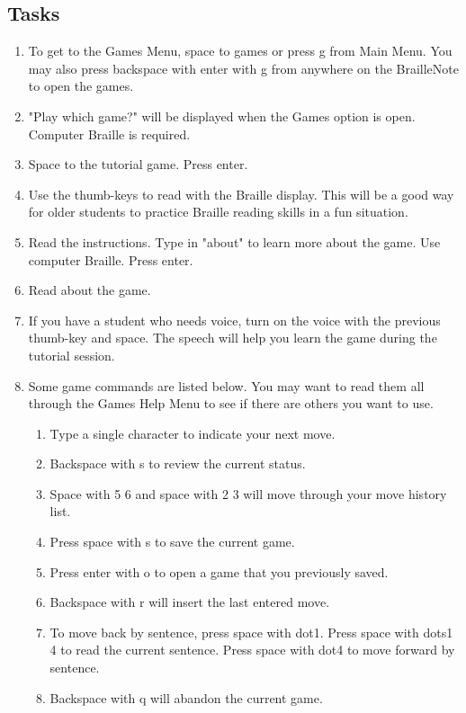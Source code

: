 \documentclass[10pt,letterpaper,twoside]{report}
\begin{document}
{{{\begin{enumerate}
	       \subsection{Tasks}
	      \begin{enumerate}
		      \item To get to the Games Menu, space to games or press g from Main Menu.  You may also press backspace with enter with g from anywhere on the BrailleNote to open the games.
		      \item "Play which game?" will be displayed when the Games option is open. Computer Braille is required.
		      \item Space to the tutorial game.  Press enter.
		      \item Use the thumb-keys to read with the Braille display.  This will be a good way for older students to practice Braille reading skills in a fun situation.
		      \item Read the instructions. Type in "about" to learn more about the game.  Use computer Braille.  Press enter.
		      \item Read about the game.
		      \item If you have a student who needs voice, turn on the voice with the previous thumb-key and space.  The speech will help you learn the game during the tutorial session.
		      \item Some game commands are listed below.  You may want to read them all through the Games Help Menu to see if there are others you want to use.
		            \begin{enumerate}
			            \item Type a single character to indicate your next move.
			            \item Backspace with s to review the current status.
			            \item Space with 5 6 and space with 2 3 will move through your move history list.
			            \item Press space with s to save the current game.
			            \item Press enter with o to open a game that you previously saved.
			            \item Backspace with r will insert the last entered move.
			            \item To move back by sentence, press space with dot1. Press space with dots1 4 to read the current sentence.  Press space with dot4 to move forward by sentence.
			            \item Backspace with q will abandon the current game.

\end{enumerate}
\end{enumerate}
\end{enumerate}}}}
\end{document}
